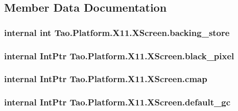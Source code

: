 \subsection{Member Data Documentation}
\hypertarget{struct_tao_1_1_platform_1_1_x11_1_1_x_screen_ab306d8dd194f4c73ada5ae79beac2bd2}{
\subsubsection[{backing\_\-store}]{\setlength{\rightskip}{0pt plus 5cm}internal int {\bf Tao.Platform.X11.XScreen.backing\_\-store}}}
\label{struct_tao_1_1_platform_1_1_x11_1_1_x_screen_ab306d8dd194f4c73ada5ae79beac2bd2}
\hypertarget{struct_tao_1_1_platform_1_1_x11_1_1_x_screen_abb888f301eea38ae4782277cd7318775}{
\subsubsection[{black\_\-pixel}]{\setlength{\rightskip}{0pt plus 5cm}internal IntPtr {\bf Tao.Platform.X11.XScreen.black\_\-pixel}}}
\label{struct_tao_1_1_platform_1_1_x11_1_1_x_screen_abb888f301eea38ae4782277cd7318775}
\hypertarget{struct_tao_1_1_platform_1_1_x11_1_1_x_screen_a675f385bf9040753d412dec9e18e71a8}{
\subsubsection[{cmap}]{\setlength{\rightskip}{0pt plus 5cm}internal IntPtr {\bf Tao.Platform.X11.XScreen.cmap}}}
\label{struct_tao_1_1_platform_1_1_x11_1_1_x_screen_a675f385bf9040753d412dec9e18e71a8}
\hypertarget{struct_tao_1_1_platform_1_1_x11_1_1_x_screen_af9b8ca6e18228e36b0a6300a0b8c01b9}{
\subsubsection[{default\_\-gc}]{\setlength{\rightskip}{0pt plus 5cm}internal IntPtr {\bf Tao.Platform.X11.XScreen.default\_\-gc}}}

